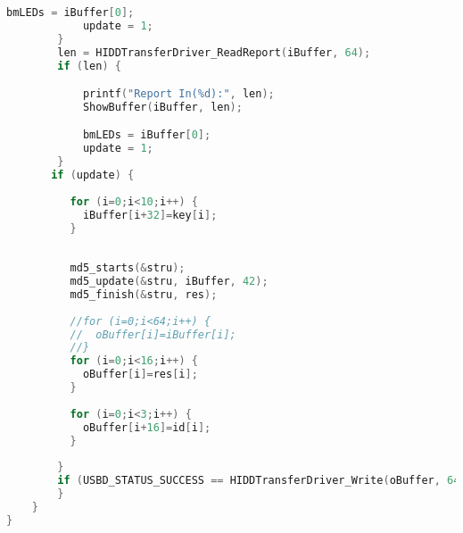 {\begin{lstlisting}[language=C++]
            bmLEDs = iBuffer[0];
            update = 1;
        }
        len = HIDDTransferDriver_ReadReport(iBuffer, 64);
        if (len) {

            printf("Report In(%d):", len);
            ShowBuffer(iBuffer, len);

            bmLEDs = iBuffer[0];
            update = 1;
        }
       if (update) {
          
          for (i=0;i<10;i++) {
            iBuffer[i+32]=key[i];
          }
          
          
          md5_starts(&stru);
          md5_update(&stru, iBuffer, 42);
          md5_finish(&stru, res);
          
          //for (i=0;i<64;i++) {
          //  oBuffer[i]=iBuffer[i];
          //}
          for (i=0;i<16;i++) {
            oBuffer[i]=res[i];
          }
          
          for (i=0;i<3;i++) {
            oBuffer[i+16]=id[i];
          }
        
        }
        if (USBD_STATUS_SUCCESS == HIDDTransferDriver_Write(oBuffer, 64, 0, 0)) {
        }        
    }
}

\end{lstlisting}}


